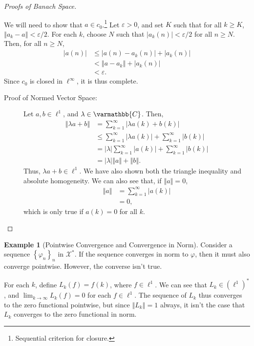 \documentclass[10pt]{extarticle}
\newcommand{\C}{\mathbb{C}}
\newcommand{\norm}[1]{\left\Vert #1\right\Vert}
\newcommand{\set}[1]{\left\{#1\right\}}
\newcommand{\ve}{\varepsilon}
\theoremstyle{plain}
\theoremstyle{definition}
\newtheorem*{example}{Example}
\theoremstyle{note}
\renewcommand*{\mathbb}[1]{\varmathbb{#1}}
\renewcommand{\newline}{\hfill\break}
\begin{document}
\begin{proof}[Proofs of Banach Space]
\begin{description}[font = \normalfont]
\begin{description}
          We will need to show that $a\in c_0$.\footnote{Sequential criterion for closure.} Let $\ve > 0$, and set $K$ such that for all $k\geq K$, $\norm{a_k - a} < \ve/2$. For each $k$, choose $N$ such that $|a_k(n)| < \ve/2$ for all $n \geq N$. Then, for all $n\geq N$,
          \begin{align*}
            \left\vert a(n) \right\vert &\leq \left\vert a(n) - a_k(n) \right\vert + \left\vert a_k(n) \right\vert\\
                                        &< \norm{a - a_k} + \left\vert a_k(n) \right\vert\\
                                        &< \ve.
          \end{align*}
          Since $c_0$ is closed in $\ell^{\infty}$, it is thus complete.
      \end{description}
    \item[$\ell^{1}$:]\hfill
      \begin{description}
        \item[Proof of Normed Vector Space:] Let $a,b\in \ell^{1}$, and $\lambda \in \C$. Then,
          \begin{align*}
            \norm{\lambda a + b} &= \sum_{k=1}^{\infty}\left\vert \lambda a(k) + b(k) \right\vert\\
                                 &\leq \sum_{k=1}^{\infty}\left\vert \lambda a(k) \right\vert + \sum_{k=1}^{\infty}\left\vert b(k) \right\vert\\
                                 &= |\lambda|\sum_{k=1}^{\infty}\left\vert a(k) \right\vert + \sum_{k=1}^{\infty}\left\vert b(k) \right\vert\\
                                 &= |\lambda|\norm{a} + \norm{b}.
          \end{align*}
          Thus, $\lambda a + b\in \ell^{1}$. We have also shown both the triangle inequality and absolute homogeneity. We can also see that, if $\norm{a} = 0$,
          \begin{align*}
            \norm{a} &= \sum_{k=1}^{\infty}\left\vert a(k) \right\vert\\
            &= 0,
          \end{align*}
          which is only true if $a(k) = 0$ for all $k$.
      \end{description}
  \end{description}
\end{proof}
\begin{example}[Pointwise Convergence and Convergence in Norm]
  Consider a sequence $\set{\varphi_n}_n$ in $\mathcal{X}^{\ast}$. If the sequence converges in norm to $\varphi$, then it must also converge pointwise. However, the converse isn't true.\newline

  For each $k$, define $L_k(f) = f(k)$, where $f\in \ell^{1}$. We can see that $L_k \in \left(\ell^{1}\right)^{\ast}$, and $\lim_{k\rightarrow\infty}L_k(f) = 0$ for each $f\in \ell^{1}$. The sequence of $L_k$ thus converges to the zero functional pointwise, but since $\norm{L_k} = 1$ always, it isn't the case that $L_k$ converges to the zero functional in norm.
\end{example}
\end{document}
